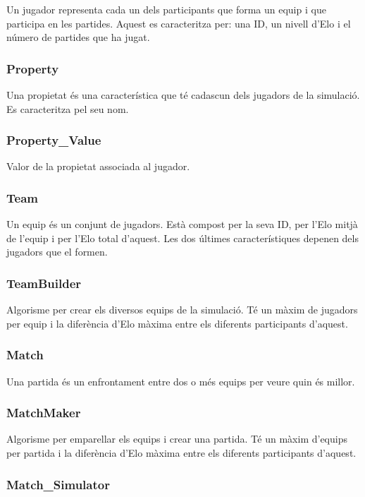 \documentclass[a4paper]{article}
\begin{document}
Un jugador representa cada un dels participants que forma un equip i que participa en les partides. Aquest es caracteritza per: una ID, un nivell d'Elo i el número de partides que ha jugat.

\subsubsection*{Property}

Una propietat és una característica que té cadascun dels jugadors de la simulació. Es caracteritza pel seu nom.

\subsubsection*{Property\_Value}

Valor de la propietat associada al jugador.

\subsubsection*{Team}

Un equip és un conjunt de jugadors. Està compost per la seva ID, per l'Elo mitjà de l'equip i per l'Elo total d'aquest. Les dos últimes característiques depenen dels jugadors que el formen.

\subsubsection*{TeamBuilder}

Algorisme per crear els diversos equips de la simulació. Té un màxim de jugadors per equip i la diferència d'Elo màxima entre els diferents participants d'aquest.

\subsubsection*{Match}

Una partida és un enfrontament entre dos o més equips per veure quin és millor.

\subsubsection*{MatchMaker}

Algorisme per emparellar els equips i crear una partida. Té un màxim d'equips per partida i la diferència d'Elo màxima entre els diferents participants d'aquest.

\subsubsection*{Match\_Simulator}
\end{document}
